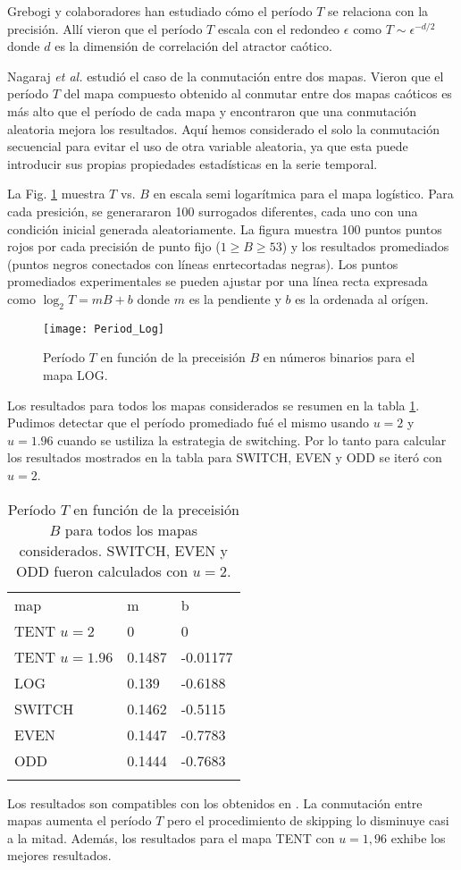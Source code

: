 Grebogi y colaboradores \cite{Grebogi1988} han estudiado cómo el período $T$ se relaciona con la precisión.
Allí vieron que el período $T$ escala con el redondeo $\epsilon$ como $T \sim \epsilon^{-d/2}$ donde $d$ es la dimensión de correlación del atractor caótico.

Nagaraj \textit{et al.} \cite{Nagaraj2008} estudió el caso de la conmutación entre dos mapas.
Vieron que el período $T$ del mapa compuesto obtenido al conmutar entre dos mapas caóticos es más alto que el período de cada mapa y encontraron que una conmutación aleatoria mejora los resultados.
Aquí hemos considerado el solo la conmutación secuencial para evitar el uso de otra variable aleatoria, ya que esta puede introducir sus propias propiedades estadísticas en la serie temporal.

La Fig. \ref{fig:period} muestra $T$ vs. $B$ en escala semi logarítmica para el mapa logístico.
Para cada presición, se generararon 100 surrogados diferentes, cada uno con una condición inicial generada aleatoriamente.
La figura muestra 100 puntos puntos rojos por cada precisión de punto fijo ($1 \geq B \geq 53$) y los resultados promediados (puntos negros conectados con líneas enrtecortadas negras).
Los puntos promediados experimentales se pueden ajustar por una línea recta expresada como $\log_2 T = mB + b$ donde $m$ es la pendiente y $b$ es la ordenada al orígen.
%
\begin{figure}[htpb]
\centering	
	\texttt{[image: Period\_Log]}
	\caption{Período $T$ en función de la preceisión $B$ en números binarios para el mapa LOG.} \label{fig:period}
\end{figure}

Los resultados para todos los mapas considerados se resumen en la tabla \ref{tabla:periodos}.
Pudimos detectar que el período promediado fué el mismo usando $u=2$ y $u=1.96$ cuando se ustiliza la estrategia de switching.
Por lo tanto para calcular los resultados mostrados en la tabla para SWITCH, EVEN y ODD se iteró con $u=2$.
%
\begin{table}[htpb]
	\centering	
	\caption{Período $T$ en función de la preceisión $B$ para todos los mapas considerados. SWITCH, EVEN y ODD fueron calculados con $u=2$.}
	\vspace{1em}
	\begin{tabular}{lll}
		\hline\noalign{\smallskip}
		map 			& m 	& b  \\
		\noalign{\smallskip}\hline\noalign{\smallskip}
		TENT $u=2$		&0 		& 0 \\
		TENT $u=1.96$ 	&0.1487 & -0.01177 \\
		LOG 			&0.139 	& -0.6188 \\
		SWITCH 			&0.1462 & -0.5115 \\
		EVEN 			&0.1447 & -0.7783 \\
		ODD 			&0.1444 & -0.7683 \\
		\noalign{\smallskip}\hline
	\end{tabular}
	\label{tabla:periodos}	
\end{table}

Los resultados son compatibles con los obtenidos en \cite{Nagaraj2008}.
La conmutación entre mapas aumenta el período $T$ pero el procedimiento de skipping lo disminuye casi a la mitad.
Además, los resultados para el mapa TENT con $u=1,96$ exhibe los mejores resultados.